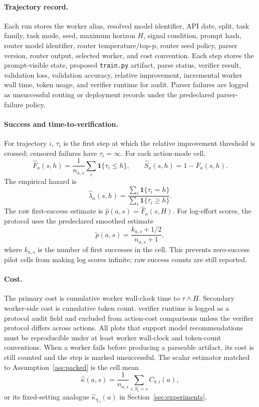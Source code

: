\documentclass{article}
\newcommand{\one}{\mathbf{1}}
\begin{document}
\paragraph{Trajectory record.}
Each run stores the worker alias, resolved model identifier, API date, split, task family, task mode, seed, maximum horizon $H$, signal condition, prompt hash, router model identifier, router temperature/top-p, router seed policy, parser version, router output, selected worker, and cost convention.
Each step stores the prompt-visible state, proposed \texttt{train.py} artifact, parse status, verifier result, validation loss, validation accuracy, relative improvement, incremental worker wall time, token usage, and verifier runtime for audit.
Parser failures are logged as unsuccessful routing or deployment records under the predeclared parser-failure policy.

\paragraph{Success and time-to-verification.}
For trajectory $i$, $\tau_i$ is the first step at which the relative improvement threshold is crossed; censored failures have $\tau_i=\infty$.
For each action-mode cell,
\[
  \hat F_a(s,h)=\frac{1}{n_{a,s}}\sum_i\one\{\tau_i\le h\},
  \qquad
  \hat S_a(s,h)=1-\hat F_a(s,h).
\]
The empirical hazard is
\[
  \hat\lambda_a(s,h)=
  \frac{\sum_i\one\{\tau_i=h\}}
       {\sum_i\one\{\tau_i\ge h\}} .
\]
The raw first-success estimate is $\hat p(a,s)=\hat F_a(s,H)$.
For log-effort scores, the protocol uses the predeclared smoothed estimate
\[
\tilde p(a,s)=\frac{k_{a,s}+1/2}{n_{a,s}+1},
\]
where $k_{a,s}$ is the number of first successes in the cell.
This prevents zero-success pilot cells from making log scores infinite; raw success counts are still reported.

\paragraph{Cost.}
The primary cost is cumulative worker wall-clock time to $\tau\wedge H$.
Secondary worker-side cost is cumulative token count.
verifier runtime is logged as a protocol audit field and excluded from action-cost comparisons unless the verifier protocol differs across actions.
All plots that support model recommendations must be reproducible under at least worker wall-clock and token-count conventions.
When a worker fails before producing a parseable artifact, its cost is still counted and the step is marked unsuccessful.
The scalar estimator matched to Assumption~\ref{ass:packed} is the cell mean
\[
\hat\kappa(a,s)=\frac{1}{n_{a,s}}\sum_{i:S_i=s} C_{\delta,i}(a),
\]
or its fixed-setting analogue $\hat\kappa_{\chi_s}(a)$ in Section~\ref{sec:experiments}.
\end{document}
